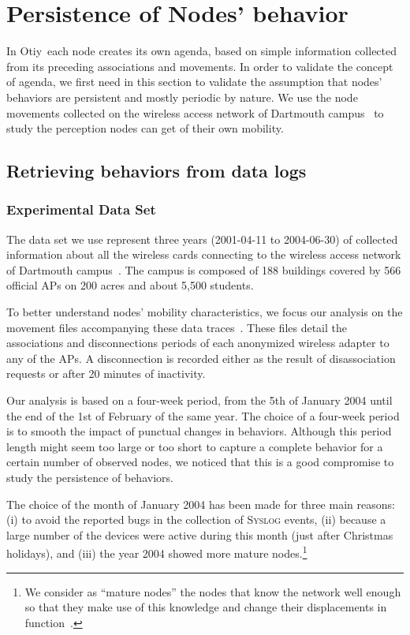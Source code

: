 \documentclass[a4paper]{sig-alternate-10pt}
\newcommand{\otiy}{{\sffamily Otiy}}
\begin{document}
\section{Persistence of Nodes' behavior}
\label{sec:environment}

In \otiy\, each node creates its own agenda, based on simple
information collected from its preceding associations and movements.
In order to validate the concept of agenda, we first need in this
section to validate the assumption that nodes' behaviors are
persistent and mostly periodic by nature. We use the node movements
collected on the wireless access network of Dartmouth
campus~\cite{dartmouth-campus-movement-2005-03-08} to study the
perception nodes can get of their own mobility.

\subsection{Retrieving behaviors from data logs}

\subsubsection{Experimental Data Set}

The data set we use represent three years (2001-04-11 to 2004-06-30)
of collected information about all the wireless cards connecting to
the wireless access network of Dartmouth
campus~\cite{dartmouth-campus-syslog}. The campus is
composed of 188 buildings covered by 566 official APs on 200 acres
and about 5,500 students.

To better understand nodes' mobility characteristics, we focus our
analysis on the movement files accompanying these data
traces~\cite{dartmouth-campus-movement-2005-03-08}. These files
detail the associations and disconnections periods of each
anonymized wireless adapter to any of the APs.  A disconnection is
recorded either as the result of disassociation requests or after 20
minutes of inactivity.

Our analysis is based on a four-week period, from the 5th of January
2004 until the end of the 1st of February of the same year. The
choice of a four-week period is to smooth the impact of punctual
changes in behaviors. Although this period length might seem too
large or too short to capture a complete behavior for a certain
number of observed nodes, we noticed that this is a good compromise
to study the persistence of behaviors.

The choice of the month of January 2004 has been made for three main
reasons: (i) to avoid the reported bugs in the collection of
\textsc{Syslog} events, (ii) because a large number of the devices
were active during this month (just after Christmas holidays), and
(iii) the year 2004 showed more mature nodes.\footnote{We
consider as ``mature nodes'' the nodes that know the network
well enough so that they make use of this knowledge and change their
displacements in function~\cite{henders_usage}.}
\end{document}
